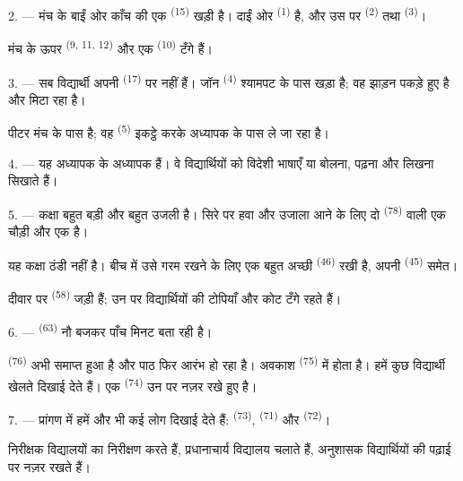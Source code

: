 2. --- मंच के बाईं ओर काँच की एक  \textsuperscript{(15)} खड़ी है।
दाईं ओर  \textsuperscript{(1)} है, और उस पर 
\textsuperscript{(2)} तथा  \textsuperscript{(3)}।

मंच के ऊपर  \textsuperscript{(9, 11, 12)} और एक
 \textsuperscript{(10)} टँगे हैं।

3. --- सब विद्यार्थी अपनी  \textsuperscript{(17)} पर नहीं हैं। जॉन
\textsuperscript{(4)} श्यामपट के पास खड़ा है; वह झाड़न पकड़े हुए है और
 मिटा रहा है।

पीटर मंच के पास है; वह  \textsuperscript{(5)} इकट्ठे करके
अध्यापक के पास ले जा रहा है।

4. --- यह अध्यापक  के अध्यापक हैं। वे विद्यार्थियों को
विदेशी भाषाएँ  या
 बोलना, पढ़ना और लिखना सिखाते हैं।

5. --- कक्षा बहुत बड़ी और बहुत उजली है। सिरे पर हवा और उजाला आने के लिए दो
 \textsuperscript{(78)} वाली एक चौड़ी  और एक
 है।

यह कक्षा ठंडी नहीं है। बीच में उसे गरम रखने के लिए एक बहुत अच्छी
 \textsuperscript{(46)} रखी है, अपनी 
\textsuperscript{(45)} समेत।

दीवार पर  \textsuperscript{(58)} जड़ी हैं; उन पर विद्यार्थियों की
टोपियाँ और कोट टँगे रहते हैं।

\VUsaut{5.2mm}
\VUsaut{3.6mm}

6. ---  \textsuperscript{(63)} नौ बजकर पाँच मिनट बता रही है।

 \textsuperscript{(76)} अभी समाप्त हुआ है और पाठ फिर आरंभ हो रहा है।
अवकाश  \textsuperscript{(75)} में होता है। हमें कुछ विद्यार्थी खेलते
दिखाई देते हैं। एक  \textsuperscript{(74)} उन पर नज़र रखे हुए
है।

7. --- प्रांगण में हमें और भी कई लोग दिखाई देते हैं: 
\textsuperscript{(73)},  \textsuperscript{(71)} और 
\textsuperscript{(72)}।

निरीक्षक विद्यालयों का निरीक्षण करते हैं, प्रधानाचार्य विद्यालय चलाते हैं,
अनुशासक विद्यार्थियों की पढ़ाई पर नज़र रखते हैं।

